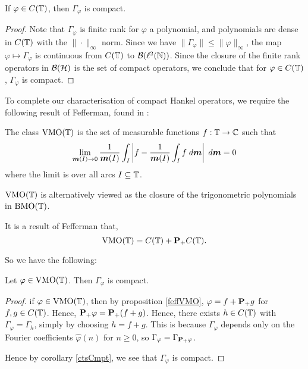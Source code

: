 \begin{corollary}
\label{ctsCmpt}
    If $\varphi \in C(\mathbb{T})$, then $\Gamma_\varphi$ is compact.
\end{corollary}
\begin{proof}
    Note that $\Gamma_\varphi$ is finite rank for $\varphi$ a polynomial,
    and polynomials are dense in $C(\mathbb{T})$ with the $\|\cdot\|_\infty$
    norm. Since we have $\|\Gamma_\varphi\| \leq \|\varphi\|_\infty$,
    the map $\varphi \mapsto \Gamma_\varphi$ is continuous
    from $C(\mathbb{T})$ to $\mathcal{B}(\ell^2(\mathbb{N}))$. Since
    the closure of the finite rank operators in $\mathcal{B}(\mathcal{H})$
    is the set of compact operators, we conclude that for
    $\varphi \in C(\mathbb{T})$, $\Gamma_\varphi$ is compact.
\end{proof} 

To complete our characterisation of compact Hankel operators, we require
the following result of Fefferman, found in \cite{Garnett}:
\begin{proposition}
\label{feffVMO}
    The class $\operatorname{VMO}(\mathbb{T})$ is the set of measurable functions $f:\mathbb{T}\rightarrow\mathbb{C}$
    such that
    \begin{equation}
        \lim_{\boldsymbol{m}(I)\rightarrow0} \frac{1}{\boldsymbol{m}(I)}\int_I \left|f-\frac{1}{\boldsymbol{m}(I)}\int_I f\;d\boldsymbol{m}\right|\;d\boldsymbol{m} = 0
    \end{equation}
    where the limit is over all arcs $I \subseteq \mathbb{T}$. 
    
    $\operatorname{VMO}(\mathbb{T})$ is alternatively viewed as the closure of the trigonometric
    polynomials in $\operatorname{BMO}(\mathbb{T})$.
    
    It is a result of Fefferman \cite{Garnett} that,
    \begin{equation}
        \operatorname{VMO}(\mathbb{T}) = C(\mathbb{T})+\mathbf{P}_+C(\mathbb{T}).
    \end{equation}
\end{proposition}

So we have the following:
\begin{proposition}
    Let $\varphi \in \operatorname{VMO}(\mathbb{T})$. Then $\Gamma_\varphi$ is compact.
\end{proposition}
\begin{proof}
    if $\varphi \in \operatorname{VMO}(\mathbb{T})$, then by proposition \ref{feffVMO}, $\varphi = f+\mathbf{P}_+g$ 
    for $f,g \in C(\mathbb{T})$. Hence,
    $\mathbf{P}_+\varphi = \mathbf{P}_+(f+g)$. Hence, there exists $h \in C(\mathbb{T})$
    with $\Gamma_{\varphi} = \Gamma_h$, simply by choosing $h = f+g$. 
    This is because $\Gamma_\varphi$ depends only on the Fourier coefficients
    $\hat{\varphi}(n)$ for $n \geq 0$, so $\Gamma_{\varphi} = \Gamma_{\mathbf{P}_+\varphi}$.
    
    Hence by corollary \ref{ctsCmpt}, we see that $\Gamma_\varphi$
    is compact.
\end{proof}



